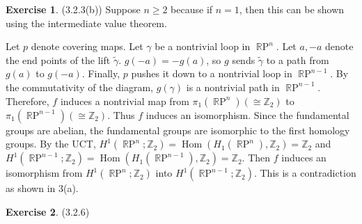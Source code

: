 \documentclass[12pt, psamsfonts]{amsart}
\theoremstyle{definition}
\newtheorem*{exer}{Exercise}
\theoremstyle{remark}
\DeclareMathOperator{\Hom}{Hom}
\DeclareMathOperator{\RP}{\mathbb{R}P}
\numberwithin{equation}{section}
\begin{document}
\begin{exer}{(3.2.3(b))}
  Suppose $n \geq 2$ because if $n = 1$, then this can be shown using the intermediate value theorem.
  \begin{center}
  \end{center}

  Let $p$ denote covering maps.
  Let $\gamma$ be a nontrivial loop in $\RP^n$.
  Let $a, -a$ denote the end points of the lift $\tilde{\gamma}$.
  $g(-a) = -g(a)$, so $g$ sends $\tilde{\gamma}$ to a path from $g(a)$ to $g(-a)$.
  Finally, $p$ pushes it down to a nontrivial loop in $\RP^{n - 1}$.
  By the commutativity of the diagram, $g(\gamma)$ is a nontrivial path in $\RP^{n - 1}$.
  Therefore, $f$ induces a nontrivial map from $\pi_1(\RP^n) (\cong \mathbb{Z}_2)$ to $\pi_1(\RP^{n - 1}) (\cong \mathbb{Z}_2)$.
  Thus $f$ induces an isomorphism.
  Since the fundamental groups are abelian, the fundamental groups are isomorphic to the first homology groups.
  By the UCT, $H^1(\RP^n; \mathbb{Z}_2) = \Hom(H_1(\RP^n), \mathbb{Z}_2) = \mathbb{Z}_2$ and $H^1(\RP^{n - 1}; \mathbb{Z}_2) = \Hom(H_1(\RP^{n - 1}), \mathbb{Z}_2) = \mathbb{Z}_2$.
  Then $f$ induces an isomorphism from $H^1(\RP^n; \mathbb{Z}_2)$ into $H^1(\RP^{n - 1}; \mathbb{Z}_2)$.
  This is a contradiction as shown in 3(a).
\end{exer}

\begin{exer}{(3.2.6)}
\end{exer}
\end{document}
